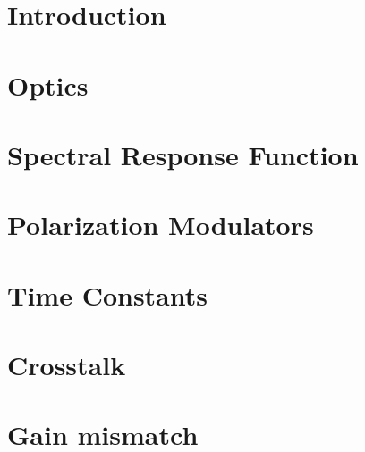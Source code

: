 \documentclass[
12pt, %
letterpaper, %
oneside, %
headinclude,footinclude, %
BCOR5mm, %
]{scrartcl}
\begin{document}

\section{Introduction}


\section{Optics}
%












\section{Spectral Response Function}


\section{Polarization Modulators}













\section{Time Constants}




\section{Crosstalk}


\section{Gain mismatch}




\end{document}
